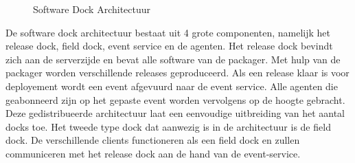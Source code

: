 \begin{figure}[!ht]
\centering
{}
\caption{Software Dock Architectuur \citep{hall1999cooperative}}
\label{fig:softwareDockAangepast}
\end{figure}

De software dock architectuur bestaat uit 4 grote componenten, namelijk het release dock, field dock, event service en de agenten.
Het release dock bevindt zich aan de serverzijde en bevat alle software van de packager.
Met hulp van de packager worden verschillende releases geproduceerd.
Als een release klaar is voor deployement wordt een event afgevuurd naar de event service.
Alle agenten die geabonneerd zijn op het gepaste event worden vervolgens op de hoogte gebracht.
Deze gedistribueerde architectuur laat een eenvoudige uitbreiding van het aantal docks toe.
Het tweede type dock dat aanwezig is in de architectuur is de field dock.
De verschillende clients functioneren als een field dock en zullen communiceren met het release dock aan de hand van de event-service.

